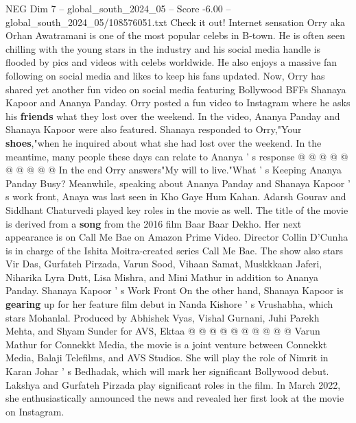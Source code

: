 \begin{textsample}{NEG Dim 7 – global\_south\_2024\_05 – Score -6.00 – global\_south\_2024\_05/108576051.txt}
Check it out!
Internet sensation Orry aka Orhan Awatramani is one of the most popular celebs in B-town.
He is often seen chilling with the young stars in the industry and his social media handle is flooded by pics and videos with celebs worldwide.
He also enjoys a massive fan following on social media and likes to keep his fans updated.
Now, Orry has shared yet another fun video on social media featuring Bollywood BFFs Shanaya Kapoor and Ananya Panday.
Orry posted a fun video to Instagram where he asks his \textbf{friends} what they lost over the weekend.
In the video, Ananya Panday and Shanaya Kapoor were also featured.
Shanaya responded to Orry,"Your \textbf{shoes},"when he inquired about what she had lost over the weekend.
In the meantime, many people these days can relate to Ananya ' s response @ @ @ @ @ @ @ @ @ @ In the end Orry answers"My will to live."What ' s Keeping Ananya Panday Busy?
Meanwhile, speaking about Ananya Panday and Shanaya Kapoor ' s work front, Anaya was last seen in Kho Gaye Hum Kahan.
Adarsh Gourav and Siddhant Chaturvedi played key roles in the movie as well.
The title of the movie is derived from a \textbf{song} from the 2016 film Baar Baar Dekho.
Her next appearance is on Call Me Bae on Amazon Prime Video.
Director Collin D'Cunha is in charge of the Ishita Moitra-created series Call Me Bae.
The show also stars Vir Das, Gurfateh Pirzada, Varun Sood, Vihaan Samat, Muskkkaan Jaferi, Niharika Lyra Dutt, Lisa Mishra, and Mini Mathur in addition to Ananya Panday.
Shanaya Kapoor ' s Work Front On the other hand, Shanaya Kapoor is \textbf{gearing} up for her feature film debut in Nanda Kishore ' s Vrushabha, which stars Mohanlal.
Produced by Abhishek Vyas, Vishal Gurnani, Juhi Parekh Mehta, and Shyam Sunder for AVS, Ektaa @ @ @ @ @ @ @ @ @ @ Varun Mathur for Connekkt Media, the movie is a joint venture between Connekkt Media, Balaji Telefilms, and AVS Studios.
She will play the role of Nimrit in Karan Johar ' s Bedhadak, which will mark her significant Bollywood debut.
Lakshya and Gurfateh Pirzada play significant roles in the film.
In March 2022, she enthusiastically announced the news and revealed her first look at the movie on Instagram.

\end{textsample}
